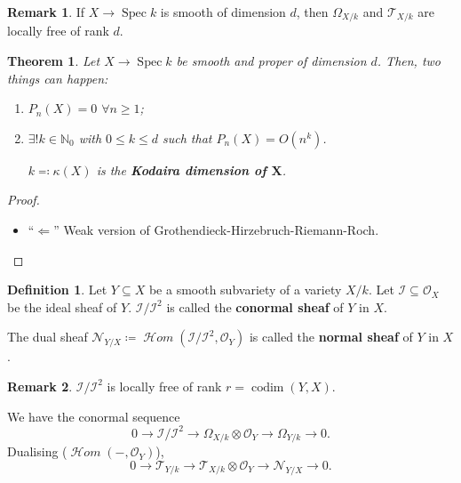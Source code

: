\documentclass[12pt]{article}
\DeclareMathOperator{\Spec}{Spec}
\DeclareMathOperator{\shHom}{\mathcal{H}\textit{om}}
\DeclareMathOperator{\codim}{codim}
\newtheorem*{theorem}{Theorem}
\theoremstyle{definition}
\newtheorem*{definition}{Definition}
\newtheorem*{remark}{Remark}
\theoremstyle{remark}
\newtheorem*{comment}{Comment}
\begin{document}
\begin{remark}
If $X\rightarrow\Spec k$ is smooth of dimension $d$, then $\Omega_{X/k}$ and $\mathcal{T}_{X/k}$ are locally free of rank $d$.
\end{remark}

\begin{comment}
The determinant isn't but the election of an isomorphism $\det:{\bigwedge}^nV\xrightarrow{\cong}\mathbb{R}$. The determinant, however, is not canonical. In $\mathbb{R}^n$, the identity matrix is assigned the determinant $1$. This is equivalent to the act of choosing the canonical base.
\end{comment}

\begin{theorem}
Let $X\rightarrow\Spec k$ be smooth and proper of dimension $d$. Then, two things can happen:
\begin{enumerate}[label=\arabic*)]
\item $P_n(X)=0$ $\forall n\geq1$;
\item $\exists!k\in\mathbb{N}_0$ with $0\leq k\leq d$ such that $P_n(X)=O(n^k)$.

$k\eqqcolon\kappa(X)$ is the \textbf{Kodaira dimension of $\boldsymbol{X}$}.
\end{enumerate}
\end{theorem}

\begin{proof}
\begin{itemize}
\item ``$\Leftarrow$'' Weak version of Grothendieck-Hirzebruch-Riemann-Roch.
\end{itemize}
\end{proof}

\begin{definition}
Let $Y\subseteq X$ be a smooth subvariety of a variety $X/k$. Let $\mathcal{I}\subseteq\mathcal{O}_X$ be the ideal sheaf of $Y$. $\mathcal{I}/\mathcal{I}^2$ is called the \textbf{conormal sheaf} of $Y$ in $X$.

The dual sheaf $\mathcal{N}_{Y/X}\coloneqq\shHom(\mathcal{I}/\mathcal{I}^2,\mathcal{O}_Y)$ is called the \textbf{normal sheaf} of $Y$ in $X$.
\end{definition}

\begin{remark}
$\mathcal{I}/\mathcal{I}^2$ is locally free of rank $r=\codim(Y,X)$.
\end{remark}

We have the conormal sequence
\[0\longrightarrow\mathcal{I}/\mathcal{I}^2\longrightarrow\Omega_{X/k}\otimes\mathcal{O}_Y\longrightarrow\Omega_{Y/k}\longrightarrow0.\]
Dualising ($\shHom(-,\mathcal{O}_Y)$),
\[0\longrightarrow\mathcal{T}_{Y/k}\longrightarrow\mathcal{T}_{X/k}\otimes\mathcal{O}_Y\longrightarrow\mathcal{N}_{Y/X}\longrightarrow0.\]
\end{document}
